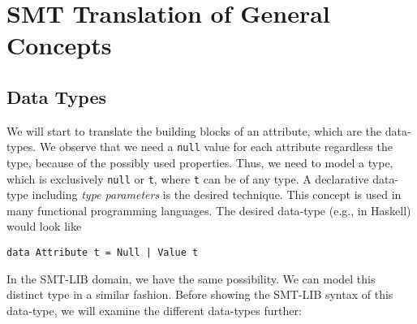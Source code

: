 

\section{SMT Translation of General Concepts}\label{sec:smt-transl-general}


\subsection*{Data Types}
We will start to translate the building blocks of an attribute, which are the data-types. We observe that we need a \verb|null| value for each attribute regardless the type, because of the possibly used properties. Thus, we need to model a type, which is exclusively \verb|null| or \verb|t|, where \verb|t| can be of any type. A declarative data-type including \emph{type parameters} is the desired technique. This concept is used in many functional programming languages. The desired data-type (e.g., in Haskell) would look like
\begin{verbatim}
data Attribute t = Null | Value t
\end{verbatim}
In the SMT-LIB domain, we have the same possibility. We can model this distinct type in a similar fashion. Before showing the SMT-LIB syntax of this data-type, we will examine the different data-types further:

